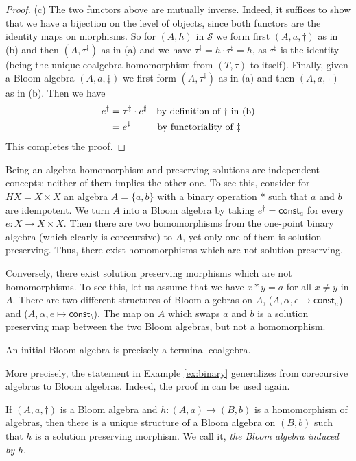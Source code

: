 \documentclass{LMCS}
\theoremstyle{plain}
\theoremstyle{definition}
\numberwithin{equation}{section}
\begin{document}
\begin{proof}
(c) The two functors above  are mutually inverse. Indeed, it suffices to show that we have  a bijection on the level of objects, since both functors    are  the identity maps on morphisms. So for $(A,h)$ in $\mathcal S$ we form first $(A,a,\dagger)$ as in (b) and then $(A,\tau^\dagger)$ as in (a) and we have $\tau^\dagger=h\cdot\tau^\sharp=h$, as $\tau^\sharp$ is the identity (being the unique coalgebra homomorphism from $(T,\tau)$ to itself). Finally, given a Bloom algebra $(A,a,\ddagger)$ we first form $(A,\tau^\ddagger)$ as in (a) and then $(A,a,\dagger)$ as in (b). Then we have
\begin{align}
e^\dagger&=\tau^\ddagger\cdot e^\sharp\notag&\text{by definition of $\dagger$ in (b)}\\
&=e^\ddag\notag&\text{by functoriality of $\ddagger$\quad\ \,}
\end{align}
This completes the proof.
\end{proof}

\begin{rem}\label{final B=final coalg}
  Being an algebra homomorphism and preserving solutions are
  independent concepts: neither of them implies the other one. To see
  this, consider for $HX = X \times X$ an algebra $A=\{a,b\}$ with a
  binary operation $*$ such that $a$ and $b$ are idempotent. We turn
  $A$ into a Bloom algebra by taking $e^\dagger=\mathsf{const}_a$ for
  every $e:X\rightarrow X\times X$. Then there are two homomorphisms
  from the one-point binary algebra (which clearly is corecursive) to
  $A$, yet only one of them is solution preserving. Thus, there exist
  homomorphisms which are not solution preserving. 

  Conversely, there
  exist solution preserving morphisms which are not homomorphisms. To
  see this, let us assume that we have $x*y=a$ for all $x\neq y$ in
  $A$. There are two different structures of Bloom algebras on $A$,
  ($A,\alpha,e\mapsto \mathsf{const}_a$) and ($A,\alpha,e\mapsto
  \mathsf{const}_b$). The map on $A$ which swaps $a$ and $b$ is a
  solution preserving map between the two Bloom algebras, but not a
  homomorphism.

\end{rem}
 \begin{prop}\label{3x}
 An initial Bloom algebra is precisely a terminal coalgebra.
   \end{prop}
More precisely, the statement in Example \ref{ex:binary} generalizes from corecursive algebras to Bloom algebras.
Indeed, the proof in \cite{cuv2} can be used again.
\begin{lem}\label{A is B then B is B}
If $(A,a,\dagger)$ is a Bloom algebra and $h:(A,a)\rightarrow (B,b)$ is a homomorphism of algebras, then there is a unique structure of a Bloom algebra on $(B,b)$ such that $h$ is a solution preserving morphism. We call it, \emph{the Bloom algebra induced by} $h$.
\end{lem}
\end{document}
